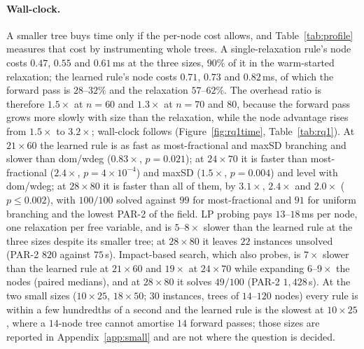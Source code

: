 \documentclass[final,5p,times,twocolumn,authoryear]{elsarticle}
\begin{document}
\paragraph{Wall-clock.} A smaller tree buys time only if the per-node cost allows, and Table~\ref{tab:profile} measures that cost by instrumenting whole trees. A single-relaxation rule's node costs $0.47$, $0.55$ and $0.61$\,ms at the three sizes, $90\%$ of it in the warm-started relaxation; the learned rule's node costs $0.71$, $0.73$ and $0.82$\,ms, of which the forward pass is $28$--$32\%$ and the relaxation $57$--$62\%$. The overhead ratio is therefore $1.5\times$ at $n=60$ and $1.3\times$ at $n=70$ and $80$, because the forward pass grows more slowly with size than the relaxation, while the node advantage rises from $1.5\times$ to $3.2\times$; wall-clock follows (Figure~\ref{fig:rq1time}, Table~\ref{tab:rq1}). At $21\times60$ the learned rule is as fast as most-fractional and maxSD branching and slower than dom/wdeg ($0.83\times$, $p=0.021$); at $24\times70$ it is faster than most-fractional ($2.4\times$, $p=4\times10^{-4}$) and maxSD ($1.5\times$, $p=0.004$) and level with dom/wdeg; at $28\times80$ it is faster than all of them, by $3.1\times$, $2.4\times$ and $2.0\times$ ($p\le0.002$), with $100/100$ solved against $99$ for most-fractional and $91$ for uniform branching and the lowest PAR-2 of the field. LP probing pays $13$--$18$\,ms per node, one relaxation per free variable, and is $5$--$8\times$ slower than the learned rule at the three sizes despite its smaller tree; at $28\times80$ it leaves $22$ instances unsolved (PAR-2 $820$ against $75$\,s). Impact-based search, which also probes, is $7\times$ slower than the learned rule at $21\times60$ and $19\times$ at $24\times70$ while expanding $6$--$9\times$ the nodes (paired medians), and at $28\times80$ it solves $49/100$ (PAR-2 $1{,}428$\,s).
At the two small sizes ($10\times25$, $18\times50$; $30$ instances, trees of $14$--$120$ nodes) every rule is within a few hundredths of a second and the learned rule is the slowest at $10\times25$, where a $14$-node tree cannot amortise $14$ forward passes; those sizes are reported in Appendix~\ref{app:small} and are not where the question is decided.
\end{document}
